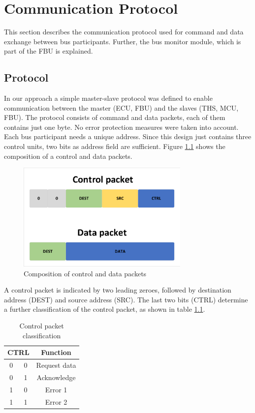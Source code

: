\chapter{Communication Protocol}

This section describes the communication protocol used for command and data exchange between bus participants. Further, the bus monitor module, which is part of the \gls{FBU} is explained.

\section{Protocol}
\label{sec:protocol}

In our approach a simple master-slave protocol was defined to enable communication between the master (\gls{ECU}, \gls{FBU}) and the slaves (\gls{THS}, \gls{MCU}, \gls{FBU}).
The protocol consists of command and data packets, each of them contains just one byte.
No error protection measures were taken into account.
Each bus participant needs a unique address. Since this design just contains three control units, two bits as address field are sufficient. Figure \ref{fig:Protocol} shows the composition of a control and data packets.

\begin{figure}[h!]
    \centering
    \includegraphics[width=0.75\textwidth]{figures/Protocol.pdf}
    \caption{Composition of control and data packets}\label{fig:Protocol}
\end{figure}

A control packet is indicated by two leading zeroes, followed by destination address (DEST) and source address (SRC). The last two bits (CTRL) determine a further classification of the control packet, as shown in table \ref{tab:controlPacket}.

\begin{table}[h!]
\begin{center}
\begin{tabular}{|c|c|c|}
\hline
\multicolumn{2}{|c|}{\textbf{CTRL}}&\textbf{Function} \\
\hline
0 & 0 & Request data \\
\hline
0 & 1 & Acknowledge \\
\hline
1 & 0 & Error 1 \\
\hline
1 & 1 & Error 2 \\
\hline
\end{tabular}
\end{center}
\caption{Control packet classification}
\label{tab:controlPacket}
\end{table}

